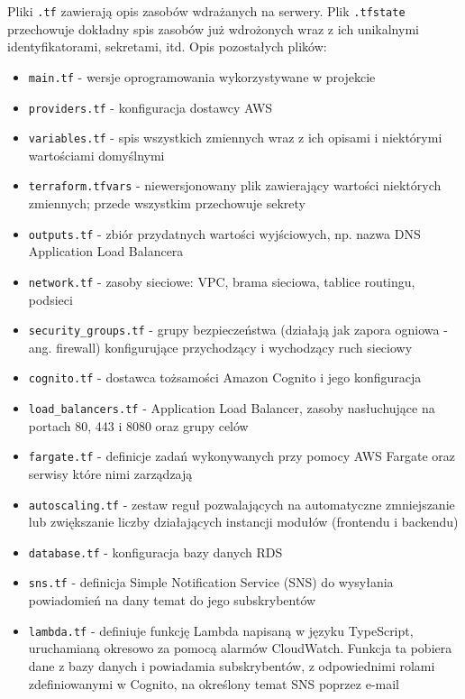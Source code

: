 \documentclass[../../main.tex]{subfiles}
\begin{document}
        Pliki \texttt{.tf} zawierają opis zasobów wdrażanych na serwery. Plik \texttt{.tfstate} przechowuje dokładny spis zasobów już wdrożonych wraz z ich unikalnymi identyfikatorami, sekretami, itd. Opis pozostałych plików:
        \begin{itemize}
            \item \texttt{main.tf} - wersje oprogramowania wykorzystywane w projekcie
            \item \texttt{providers.tf} - konfiguracja dostawcy AWS
            \item \texttt{variables.tf} - spis wszystkich zmiennych wraz z ich opisami i niektórymi wartościami domyślnymi
            \item \texttt{terraform.tfvars} - niewersjonowany plik zawierający wartości niektórych zmiennych; przede wszystkim przechowuje sekrety
            \item \texttt{outputs.tf} - zbiór przydatnych wartości wyjściowych, np. nazwa DNS Application Load Balancera
            \item \texttt{network.tf} - zasoby sieciowe: VPC, brama sieciowa, tablice routingu, podsieci
            \item \texttt{security\_groups.tf} - grupy bezpieczeństwa (działają jak zapora ogniowa - ang. firewall) konfigurujące przychodzący i wychodzący ruch sieciowy
            \item \texttt{cognito.tf} - dostawca tożsamości Amazon Cognito i jego konfiguracja
            \item \texttt{load\_balancers.tf} - Application Load Balancer, zasoby nasłuchujące na portach 80, 443 i 8080 oraz grupy celów
            \item \texttt{fargate.tf} - definicje zadań wykonywanych przy pomocy AWS Fargate oraz serwisy które nimi zarządzają
            \item \texttt{autoscaling.tf} - zestaw reguł pozwalających na automatyczne zmniejszanie lub zwiększanie liczby działających instancji modułów (frontendu i backendu)
            \item \texttt{database.tf} - konfiguracja bazy danych RDS
            \item \texttt{sns.tf} - definicja Simple Notification Service (SNS) do wysyłania powiadomień na dany temat do jego subskrybentów
            \item \texttt{lambda.tf} - definiuje funkcję Lambda napisaną w języku TypeScript, uruchamianą okresowo za pomocą alarmów CloudWatch. Funkcja ta pobiera dane z bazy danych i powiadamia subskrybentów, z odpowiednimi rolami zdefiniowanymi w Cognito, na określony temat SNS poprzez e-mail
        \end{itemize}
\end{document}
